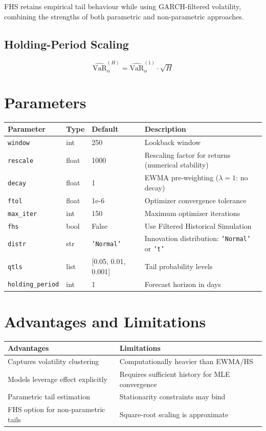 \documentclass[11pt, a4paper]{article}
\begin{document}
FHS retains empirical tail behaviour while using GARCH-filtered volatility,
combining the strengths of both parametric and non-parametric approaches.

\subsection{Holding-Period Scaling}

\begin{equation}
\widehat{\text{VaR}}_\alpha^{(H)} = \widehat{\text{VaR}}_\alpha^{(1)} \cdot \sqrt{H}
\end{equation}

\section{Parameters}

\begin{tabular}{llll}
\toprule
Parameter & Type & Default & Description \\
\midrule
\texttt{window}   & int   & 250   & Lookback window \\
\texttt{rescale}  & float & 1000  & Rescaling factor for returns (numerical stability) \\
\texttt{decay}    & float & 1     & EWMA pre-weighting ($\lambda=1$: no decay) \\
\texttt{ftol}     & float & 1e-6  & Optimizer convergence tolerance \\
\texttt{max\_iter}& int   & 150   & Maximum optimizer iterations \\
\texttt{fhs}      & bool  & False & Use Filtered Historical Simulation \\
\texttt{distr}    & str   & \texttt{'Normal'} & Innovation distribution: \texttt{'Normal'} or \texttt{'t'} \\
\texttt{qtls}     & list  & [0.05, 0.01, 0.001] & Tail probability levels \\
\texttt{holding\_period} & int & 1 & Forecast horizon in days \\
\bottomrule
\end{tabular}

\section{Advantages and Limitations}

\begin{tabular}{p{6cm} p{8cm}}
\toprule
Advantages & Limitations \\
\midrule
Captures volatility clustering & Computationally heavier than EWMA/HS \\
Models leverage effect explicitly & Requires sufficient history for MLE convergence \\
Parametric tail estimation & Stationarity constraints may bind \\
FHS option for non-parametric tails & Square-root scaling is approximate \\
\bottomrule
\end{tabular}
\end{document}
